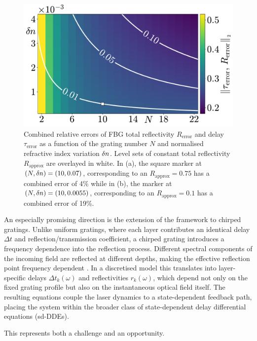 \begin{figure}
    \centering
    
    \includegraphics[width=0.95\linewidth]{Images/NR_Selection.pdf}
    
    \caption{Combined relative errors of FBG total reflectivity $R_\text{error}$ and delay $\tau_\text{error}$ as a function of the grating number $N$ and normalised refractive index variation $\delta n$. 
    Level sets of constant total reflectivity $R_\text{approx}$ are overlayed in white. 
    In (a), the square marker at $(N,\delta n) = (10, 0.07)$, corresponding to an $R_\text{approx} = 0.75$ has a combined error of 4\% while in (b), the marker at $(N,\delta n) = (10, 0.0055)$, 
    corresponding to an $R_\text{approx} = 0.1$ has a combined error of 19\%.}
    
    \label{fig:NR_Selection}
\end{figure}
%
An especially promising direction is the extension of the framework to chirped gratings. 
Unlike uniform gratings, where each layer contributes an identical delay $\Delta t$ and reflection/transmission coefficient, a chirped grating introduces a frequency dependence into the reflection process. 
Different spectral components of the incoming field are reflected at different depths, making the effective reflection point frequency dependent \cite{erdogan1997fibre}. 
In a discretised model this translates into layer-specific delays $\Delta t_k(\omega)$ and reflectivities $r_k(\omega)$, which depend not only on the fixed grating profile but also on the instantaneous optical field itself. 
The resulting equations couple the laser dynamics to a state-dependent feedback path, placing the system within the broader class of state-dependent delay differential equations (sd-DDEs). 
%
\par
%
This represents both a challenge and an opportunity. 
